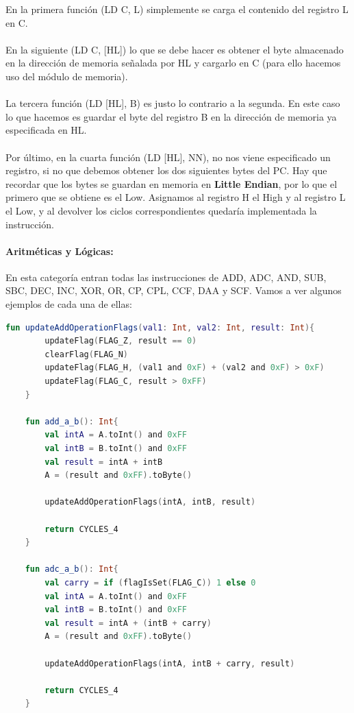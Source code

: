 En la primera función (LD C, L) simplemente se carga el contenido del registro L en C.
\\\\
En la siguiente (LD C, [HL]) lo que se debe hacer es obtener el byte almacenado en la dirección de memoria señalada por HL y cargarlo en C (para ello hacemos uso del módulo de memoria).
\\\\
La tercera función (LD [HL], B) es justo lo contrario a la segunda. En este caso lo que hacemos es guardar el byte del registro B en la dirección de memoria ya especificada en HL.
\\\\
Por último, en la cuarta función (LD [HL], NN), no nos viene especificado un registro, si no que debemos obtener los dos siguientes bytes del PC. Hay que recordar que los bytes se guardan en memoria en \textbf{Little Endian}, por lo que el primero que se obtiene es el Low. Asignamos al registro H el High y al registro L el Low, y al devolver los ciclos correspondientes quedaría implementada la instrucción.

\paragraph{Aritméticas y Lógicas:} En esta categoría entran todas las instrucciones de ADD, ADC, AND, SUB, SBC, DEC, INC, XOR, OR, CP, CPL, CCF, DAA y SCF. Vamos a ver algunos ejemplos de cada una de ellas:

\begin{lstlisting}[language=Kotlin, caption={Operaciones ADD y ADC}, label={code:kotlinaddc}]
    fun updateAddOperationFlags(val1: Int, val2: Int, result: Int){
        updateFlag(FLAG_Z, result == 0)
        clearFlag(FLAG_N)
        updateFlag(FLAG_H, (val1 and 0xF) + (val2 and 0xF) > 0xF)
        updateFlag(FLAG_C, result > 0xFF)
    }

    fun add_a_b(): Int{
        val intA = A.toInt() and 0xFF
        val intB = B.toInt() and 0xFF
        val result = intA + intB
        A = (result and 0xFF).toByte()

        updateAddOperationFlags(intA, intB, result)

        return CYCLES_4
    }

    fun adc_a_b(): Int{
        val carry = if (flagIsSet(FLAG_C)) 1 else 0
        val intA = A.toInt() and 0xFF
        val intB = B.toInt() and 0xFF
        val result = intA + (intB + carry)
        A = (result and 0xFF).toByte()

        updateAddOperationFlags(intA, intB + carry, result)

        return CYCLES_4
    }
\end{lstlisting}

